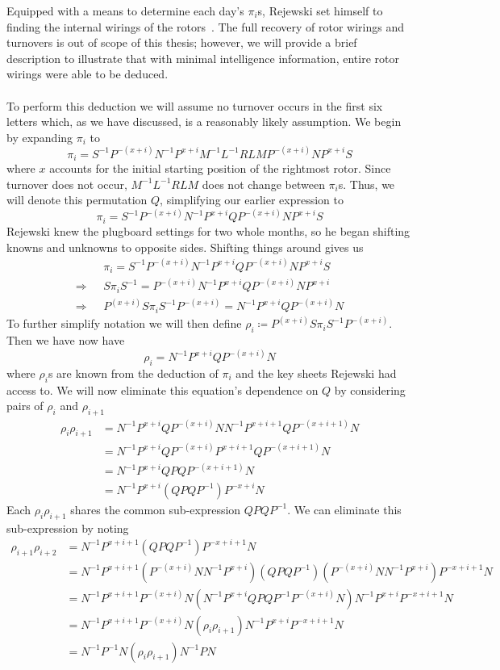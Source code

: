 Equipped with a means to determine each day's $\pi_i$s, Rejewski set
himself to finding the internal wirings of the rotors~\cite[pp.~219--221]{Rejewski1981}. The full
recovery of rotor wirings and turnovers is out of scope of this thesis;
however, we will provide a brief description to illustrate that with
minimal intelligence information, entire rotor wirings were able to be deduced.
\\\\To perform this deduction we will assume no turnover occurs in
the first six letters which, as we have discussed, is a reasonably
likely assumption. We begin by expanding $\pi_i$ to
\[
  \pi_i = S^{-1}P^{-(x+i)}N^{-1}P^{x+i}M^{-1}L^{-1}RLMP^{-(x+i)}NP^{x+i}S
\]
where $x$ accounts for the initial starting position of the rightmost rotor.
Since turnover does not occur, $M^{-1}L^{-1}RLM$ does not change
between $\pi_i$s. Thus, we will
denote this permutation $Q$, simplifying our earlier expression to
\[
  \pi_i = S^{-1}P^{-(x+i)}N^{-1}P^{x+i}QP^{-(x+i)}NP^{x+i}S
\]
Rejewski knew the plugboard settings for two whole months, so he
began shifting knowns and unknowns to opposite sides. Shifting things
around gives us
\begin{align*}
  & \pi_i = S^{-1}P^{-(x+i)}N^{-1}P^{x+i}QP^{-(x+i)}NP^{x+i}S \\
  \Rightarrow\text{ } & S\pi_i S^{-1} =
  P^{-(x+i)}N^{-1}P^{x+i}QP^{-(x+i)}NP^{x+i}
  \\
  \Rightarrow\text{ } & P^{(x+i)}S\pi_i S^{-1}P^{-(x+i)} =
  N^{-1}P^{x+i}QP^{-(x+i)}N
\end{align*}
To further simplify notation we will then define ${\rho_i} \coloneq
P^{(x+i)}S\pi_i S^{-1}P^{-(x+i)}$. Then we have now have
\[
  \rho_i = N^{-1}P^{x+i}QP^{-(x+i)}N
\]
where $\rho_i$s are known from the deduction of $\pi_i$ and the
key sheets Rejewski had access to.
We will now eliminate this equation's dependence on $Q$ by considering
pairs of $\rho_i$ and $\rho_{i+1}$
\begin{align*}
  \rho_i\rho_{i+1} & = N^{-1}P^{x+i}QP^{-(x+i)}NN^{-1}P^{x+i+1}QP^{-(x+i+1)}N \\
  & = N^{-1}P^{x+i}QP^{-(x+i)}P^{x+i+1}QP^{-(x+i+1)}N        \\
  & = N^{-1}P^{x+i}QPQP^{-(x+i+1)}N                          \\
  & =N^{-1}P^{x+i}(QPQP^{-1})P^{-{x+i}}N
\end{align*}
Each $\rho_i\rho_{i+1}$ shares the common sub-expression $QPQP^{-1}$.
We can eliminate this sub-expression by noting
\begin{align*}
  \rho_{i+1}\rho_{i+2} & = N^{-1}P^{x+i+1}(QPQP^{-1})P^{-{x+i+1}}N
  \\
  & =
  N^{-1}P^{x+i+1}(P^{-(x+i)}NN^{-1}P^{x+i})(QPQP^{-1})(P^{-(x+i)}NN^{-1}P^{x+i})P^{-{x+i+1}}N
  \\
  & =
  N^{-1}P^{x+i+1}P^{-(x+i)}N(N^{-1}P^{x+i}QPQP^{-1}P^{-(x+i)}N)N^{-1}P^{x+i}P^{-{x+i+1}}N
  \\
  & =
  N^{-1}P^{x+i+1}P^{-(x+i)}N(\rho_i\rho_{i+1})N^{-1}P^{x+i}P^{-{x+i+1}}N
  \\
  & = N^{-1}P^{-1}N(\rho_i\rho_{i+1})N^{-1}PN
  \\
\end{align*}
